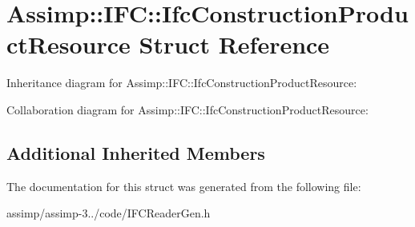 \hypertarget{struct_assimp_1_1_i_f_c_1_1_ifc_construction_product_resource}{\section{Assimp\+:\+:I\+F\+C\+:\+:Ifc\+Construction\+Product\+Resource Struct Reference}
\label{struct_assimp_1_1_i_f_c_1_1_ifc_construction_product_resource}
}


Inheritance diagram for Assimp\+:\+:I\+F\+C\+:\+:Ifc\+Construction\+Product\+Resource\+:


Collaboration diagram for Assimp\+:\+:I\+F\+C\+:\+:Ifc\+Construction\+Product\+Resource\+:
\subsection*{Additional Inherited Members}


The documentation for this struct was generated from the following file\+:\begin{DoxyCompactItemize}
\item 
assimp/assimp-\/3../code/I\+F\+C\+Reader\+Gen.\+h\end{DoxyCompactItemize}
